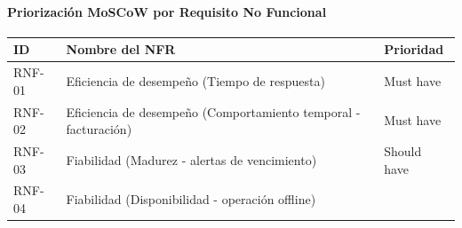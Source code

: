 \documentclass[
]{article}
\newcounter{none} %
\begin{document}
\paragraph{Priorización MoSCoW por Requisito No
Funcional}\label{priorizaciuxf3n-moscow-por-requisito-no-funcional}

{\def\LTcaptype{none} %
\begin{longtable}[]{|
  >{\raggedright\arraybackslash}p{}|
  >{\raggedright\arraybackslash}p{}|
  >{\raggedright\arraybackslash}p{}|}
\hline
\begin{minipage}[b]{\linewidth}\centering
\textbf{ID}
\end{minipage} & \begin{minipage}[b]{\linewidth}\raggedright
\textbf{Nombre del NFR}
\end{minipage} & \begin{minipage}[b]{\linewidth}\centering
\textbf{Prioridad}
\end{minipage} \\
\hline
\endhead
\hline
\endlastfoot
RNF-01 & \begin{minipage}[t]{\linewidth}\raggedright
Eficiencia de desempeño (Tiempo de respuesta)
\end{minipage} & \begin{minipage}[t]{\linewidth}\raggedright
Must have
\end{minipage} \\
\hline
RNF-02 & \begin{minipage}[t]{\linewidth}\raggedright
Eficiencia de desempeño (Comportamiento temporal - facturación)
\end{minipage} & \begin{minipage}[t]{\linewidth}\raggedright
Must have
\end{minipage} \\
\hline
RNF-03 & \begin{minipage}[t]{\linewidth}\raggedright
Fiabilidad (Madurez - alertas de vencimiento)
\end{minipage} & \begin{minipage}[t]{\linewidth}\raggedright
Should have
\end{minipage} \\
\hline
RNF-04 & \begin{minipage}[t]{\linewidth}\raggedright
Fiabilidad (Disponibilidad - operación offline)
\end{minipage} & \begin{minipage}[t]{\linewidth}\raggedright

\end{minipage}
\end{longtable}}
\end{document}
